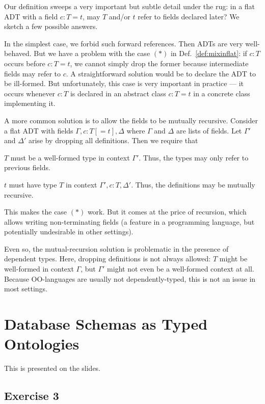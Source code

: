 \begin{remark}
Our definition sweeps a very important but subtle detail under the rug: in a flat ADT with a field $c:T=t$, may $T$ and/or $t$ refer to fields declared later?
We sketch a few possible answers.

In the simplest case, we forbid such forward references.
Then ADTs are very well-behaved.
But we have a problem with the case $(\ast)$ in Def.~\ref{def:mixinflat}: if $c:T$ occurs before $c:T=t$, we cannot simply drop the former because intermediate fields may refer to $c$.
A straightforward solution would be to declare the ADT to be ill-formed.
But unfortunately, this case is very important in practice --- it occurs whenever $c:T$ is declared in an abstract class $c:T=t$ in a concrete class implementing it.

A more common solution is to allow the fields to be mutually recursive.
Consider a flat ADT with fields $\Gamma, c:T[=t], \Delta$ where $\Gamma$ and $\Delta$ are lists of fields.
Let $\Gamma'$ and $\Delta'$ arise by dropping all definitions.
Then we require that
\begin{compactitem}
 \item $T$ must be a well-formed type in context $\Gamma'$.
 Thus, the types may only refer to previous fields.
 \item $t$ must have type $T$ in context $\Gamma',c:T,\Delta'$.
 Thus, the definitions may be mutually recursive.
\end{compactitem}
This makes the case $(\ast)$ work.
But it comes at the price of recursion, which allows writing non-terminating fields (a feature in a programming language, but potentially undesirable in other settings).

Even so, the mutual-recursion solution is problematic in the presence of dependent types.
Here, dropping definitions is not always allowed:
$T$ might be well-formed in context $\Gamma$, but $\Gamma'$ might not even be a well-formed context at all.
Because OO-languages are usually not dependently-typed, this is not an issue in most settings.
\end{remark}

\section{Database Schemas as Typed Ontologies}

This is presented on the slides.

\subsection{Exercise 3}

